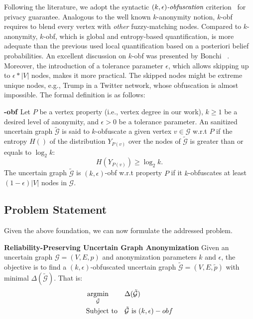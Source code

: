 Following the literature, we adopt the syntactic $\textit{$(k,\epsilon)$-obfuscation}$ criterion~\cite{Boldi_Injecting_2012} for privacy guarantee. 
Analogous to the well known $k$-anonymity notion, $k$-obf requires to blend every vertex with \emph{other} fuzzy-matching nodes. 
Compared to $k$-anonymity, $k$-obf, which is global and entropy-based quantification, is more adequate than the previous used local quantification based on a posteriori belief probabilities. An excellent discussion on $k$-obf was presented by Bonchi {\etal}~\cite{Bonchi_Identity_2014}. 
Moreover, the introduction of a tolerance parameter $\epsilon$, which allows skipping up to $\epsilon * |V|$ nodes, makes it more practical. The skipped nodes might be extreme unique nodes, e.g., Trump in a Twitter network, whose obfuscation is almost impossible.
The formal definition is as follows:
\theoremstyle{definition}
\begin{definition}
	\textbf{-obf \cite{Boldi_Injecting_2012}}
    Let $P$ be a vertex property (i.e., vertex degree in our work), $k \geq 1$ be a desired level of anonymity, and $\epsilon >0 $ be a tolerance parameter. 
    An sanitized uncertain graph $\tilde{\mathcal{G}}$ is said to $k$-obfuscate a given vertex $v \in \mathcal{G}$ w.r.t $P$ if the entropy $H()$ of the distribution $Y_{P(v)}$ over the nodes 
    of $\tilde{\mathcal{G}}$ is greater than or equals to $\log_{2}{k}$:
    \begin{equation*}
        H(Y_{P(v)}) \geq \log_{2}{k}.
    \label{obfCon}
    \end{equation*}
The uncertain graph $\tilde{\mathcal{G}}$
is $(k,\epsilon)$-obf w.r.t property $P$ 
if it $k$-obfuscates at least $(1-\epsilon)|V|$ nodes in $\mathcal{G}$. 
\label{def:obf}
\end{definition} 

\subsection{Problem Statement}
Given the above foundation, we can now formulate the addressed problem.  
\begin{problem}
	\textbf{Reliability-Preserving Uncertain Graph Anonymization}
     Given an uncertain graph $\mathcal{G}=(V,E,\mathit{p})$ and anonymization parameters $k$ and $\epsilon$, 
     the objective is to find a  $(k,\epsilon)$-obfuscated uncertain graph $\tilde{\mathcal{G}}=(V,E,\tilde{\mathit{p}})$ 
     with minimal  $\Delta(\tilde{\mathcal{G}})$. That is:
     \begin{equation*}
             \begin{aligned}
                 & \argmin_{\tilde{
                \mathcal{G}}} & & \Delta(\tilde{\mathcal{G}}) \\
                &  \text{Subject to} & &\tilde{\mathcal{G}} \text{~is~} (k,\epsilon)-obf
            \end{aligned}
     \end{equation*}
     \label{prob:unobf}
\end{problem}